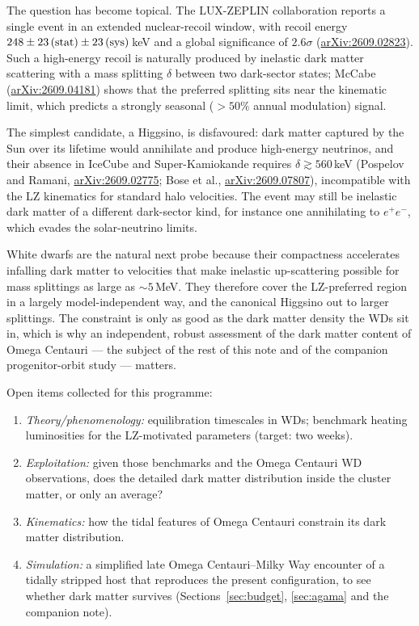 \documentclass[11pt,a4paper]{article}
\begin{document}
The question has become topical. The LUX-ZEPLIN collaboration reports a single event in an extended nuclear-recoil window, with recoil energy $248\pm23\,({\rm stat})\pm23\,({\rm sys})$\,keV and a global significance of $2.6\sigma$ (\href{https://arxiv.org/abs/2609.02823}{arXiv:2609.02823}). Such a high-energy recoil is naturally produced by inelastic dark matter scattering with a mass splitting $\delta$ between two dark-sector states; McCabe (\href{https://arxiv.org/abs/2609.04181}{arXiv:2609.04181}) shows that the preferred splitting sits near the kinematic limit, which predicts a strongly seasonal ($>50\%$ annual modulation) signal.

The simplest candidate, a Higgsino, is disfavoured: dark matter captured by the Sun over its lifetime would annihilate and produce high-energy neutrinos, and their absence in IceCube and Super-Kamiokande requires $\delta\gtrsim560$\,keV (Pospelov and Ramani, \href{https://arxiv.org/abs/2609.02775}{arXiv:2609.02775}; Bose et al., \href{https://arxiv.org/abs/2609.07807}{arXiv:2609.07807}), incompatible with the LZ kinematics for standard halo velocities. The event may still be inelastic dark matter of a different dark-sector kind, for instance one annihilating to $e^+e^-$, which evades the solar-neutrino limits.

White dwarfs are the natural next probe because their compactness accelerates infalling dark matter to velocities that make inelastic up-scattering possible for mass splittings as large as $\sim5$\,MeV. They therefore cover the LZ-preferred region in a largely model-independent way, and the canonical Higgsino out to larger splittings. The constraint is only as good as the dark matter density the WDs sit in, which is why an independent, robust assessment of the dark matter content of Omega Centauri --- the subject of the rest of this note and of the companion progenitor-orbit study --- matters.

Open items collected for this programme:
\begin{enumerate}[label=(\roman*)]
\item \emph{Theory/phenomenology:} equilibration timescales in WDs; benchmark heating luminosities for the LZ-motivated parameters (target: two weeks).
\item \emph{Exploitation:} given those benchmarks and the Omega Centauri WD observations, does the detailed dark matter distribution inside the cluster matter, or only an average?
\item \emph{Kinematics:} how the tidal features of Omega Centauri constrain its dark matter distribution.
\item \emph{Simulation:} a simplified late Omega Centauri--Milky Way encounter of a tidally stripped host that reproduces the present configuration, to see whether dark matter survives (Sections~\ref{sec:budget}, \ref{sec:agama} and the companion note).
\end{enumerate}
\end{document}
